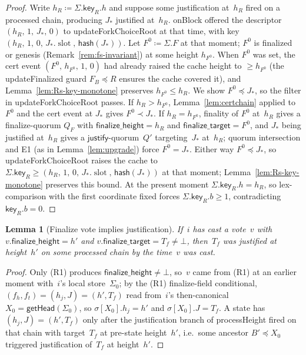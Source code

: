 \documentclass{article}
\newcommand{\slot}[0]{\ensuremath{\operatorname{\mathrm{slot}}}}
\newcommand{\just}{\ensuremath{\mathsf{justify}}\xspace}
\newcommand{\finalizeHeight}{\mathsf{finalize\_height}}
\newcommand{\finalizeTarget}{\mathsf{finalize\_target}}
\newcommand{\hash}{\mathsf{hash}}
\newcommand{\key}{\mathsf{key}}
\newcommand{\processHeight}{\textsf{processHeight}\xspace}
\newcommand{\onBlock}{\textsf{onBlock}\xspace}
\newcommand{\updateForkChoiceRoot}{\textsf{updateForkChoiceRoot}\xspace}
\newcommand{\updateFinalized}{\textsf{updateFinalized}\xspace}
\newcommand{\getHead}{\textsf{getHead}\xspace}
\theoremstyle{plain}
\newtheorem{lemma}{Lemma}
\theoremstyle{definition}
\theoremstyle{remark}
\begin{document}
\begin{proof}
Write $h_R \coloneqq \Sigma.\key_R.h$ and suppose some justification at~$h_R$ fired on a processed chain, producing $J_\ast$ justified at~$h_R$.
\onBlock offered the descriptor $(h_R,\, 1,\, J_\ast,\, 0)$ to \updateForkChoiceRoot at that time, with key $(h_R,\, 1,\, 0,\, J_\ast.\slot,\, \hash(J_\ast))$.
Let $F^0 \coloneqq \Sigma.F$ at that moment; $F^0$ is finalized or genesis (Remark~\ref{rem:fs-invariant}) at some height $h_{F^0}$.
When $F^0$ was set, the cert event $(F^0,\, h_{F^0},\, 1,\, 0)$ had already raised the cache height to $\geq h_{F^0}$ (the \updateFinalized guard $F_B \preceq R$ ensures the cache covered it), and Lemma~\ref{lem:Rs-key-monotone} preserves $h_{F^0} \leq h_R$.
We show $F^0 \preceq J_\ast$, so the filter in \updateForkChoiceRoot passes.
If $h_R > h_{F^0}$, Lemma~\ref{lem:certchain} applied to $F^0$ and the cert event at $J_\ast$ gives $F^0 \prec J_\ast$.
If $h_R = h_{F^0}$, finality of $F^0$ at~$h_R$ gives a finalize-quorum $Q_F$ with $\finalizeHeight = h_R$ and $\finalizeTarget = F^0$, and $J_\ast$ being justified at~$h_R$ gives a \just-quorum~$Q'$ targeting~$J_\ast$ at~$h_R$; quorum intersection and E1 (as in Lemma~\ref{lem:upgrade}) force $F^0 = J_\ast$.
Either way $F^0 \preceq J_\ast$, so \updateForkChoiceRoot raises the cache to $\Sigma.\key_R \geq (h_R,\, 1,\, 0,\, J_\ast.\slot,\, \hash(J_\ast))$ at that moment; Lemma~\ref{lem:Rs-key-monotone} preserves this bound.
At the present moment $\Sigma.\key_R.h = h_R$, so lex-comparison with the first coordinate fixed forces $\Sigma.\key_R.b \geq 1$, contradicting $\key_R.b = 0$.
\end{proof}

\begin{lemma}[Finalize vote implies justification]\label{lem:no-finalize-without-just}
If~$i$ has cast a vote~$v$ with $v.\finalizeHeight = h'$ and $v.\finalizeTarget = T_f \neq \bot$, then~$T_f$ was justified at height~$h'$ on some processed chain by the time~$v$ was cast.
\end{lemma}

\begin{proof}
Only (R1) produces $\finalizeHeight \neq \bot$, so~$v$ came from (R1) at an earlier moment with~$i$'s local store~$\Sigma_0$; by the (R1) finalize-field conditional, $(f_h, f_t) = (h_j, J) = (h', T_f)$ read from~$i$'s then-canonical $X_0 = \getHead(\Sigma_0)$, so $\sigma[X_0].h_j = h'$ and $\sigma[X_0].J = T_f$.
A state has $(h_j, J) = (h', T_f)$ only after the justification branch of \processHeight fired on that chain with target~$T_f$ at pre-state height~$h'$, i.e.\ some ancestor $B' \preceq X_0$ triggered justification of~$T_f$ at height~$h'$.
\end{proof}
\end{document}
